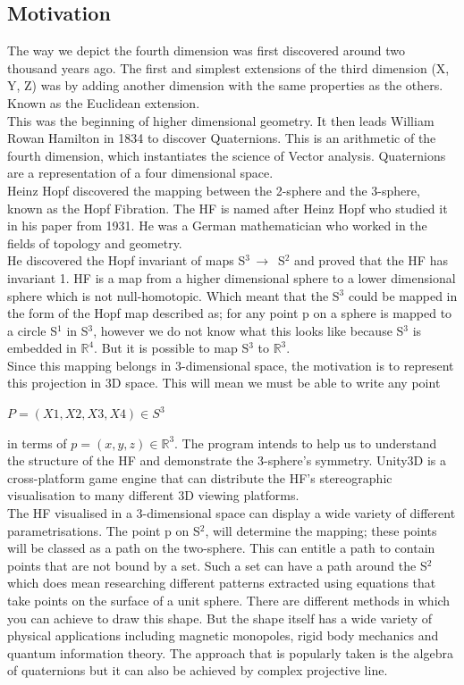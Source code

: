\documentclass[12pt]{article} %
\begin{document}
\begin{flushleft}
\subsection{Motivation} %
The way we depict the fourth dimension was first discovered around two thousand years ago. The first and simplest extensions of the third dimension (X, Y, Z) was by adding another dimension with the same properties as the others. Known as the Euclidean extension. \\
This was the beginning of higher dimensional geometry. It then leads William Rowan Hamilton in 1834 to discover Quaternions. This is an arithmetic of the fourth dimension, which instantiates the science of Vector analysis. Quaternions are a representation of a four dimensional space.\\
Heinz Hopf discovered the mapping between the 2-sphere and the 3-sphere, known as the Hopf Fibration. The HF is named after Heinz Hopf who studied it in his paper from 1931. He was a German mathematician who worked in the fields of topology and geometry.\\
He discovered the Hopf invariant of maps S$^{3} \,\to\,$ S$^{2}$ and proved that the HF has invariant 1. HF is a map from a higher dimensional sphere to a lower dimensional sphere which is not null-homotopic. Which meant that the S$^{3}$ could be mapped in the form of the Hopf map described as; for any point p on a sphere is mapped to a circle S$^{1}$ in S$^{3}$, however we do not know what this looks like because S$^{3}$ is embedded in $\mathbb{R}^{4}$. But it is possible to map S$^{3}$ to $\mathbb{R}^{3}$.\\
Since this mapping belongs in 3-dimensional space, the motivation is to represent this projection in 3D space. This will mean we must be able to write any point \\
\begin{center}$P = (X1, X2, X3, X4) \in S^{3}$\end{center}
in terms of $p = (x, y, z) \in \mathbb{R}^{3}$. The program intends to help us to understand the structure of the HF and demonstrate the 3-sphere’s symmetry. Unity3D is a cross-platform game engine that can distribute the HF’s stereographic visualisation to many different 3D viewing platforms. \\
The HF visualised in a 3-dimensional space can display a wide variety of different parametrisations. The point p on S$^{2}$, will determine the mapping; these points will be classed as a path on the two-sphere. This can entitle a path to contain points that are not bound by a set. Such a set can have a path around the S$^{2}$ which does mean researching different patterns extracted using equations that take points on the surface of a unit sphere. There are different methods in which you can achieve to draw this shape. But the shape itself has a wide variety of physical applications including magnetic monopoles, rigid body mechanics and quantum information theory. The approach that is popularly taken is the algebra of quaternions but it can also be achieved by complex projective line. \\

\end{flushleft}
\end{document}
